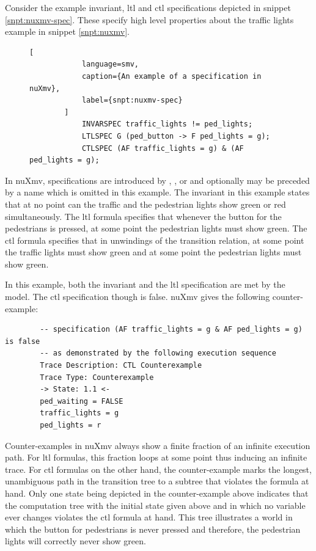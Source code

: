\begin{example}
    Consider the example invariant, \gls{ltl} and \gls{ctl} specifications depicted in snippet \ref{snpt:nuxmv-spec}.
    These specify high level properties about the traffic lights example in snippet \ref{snpt:nuxmv}.

    \begin{figure}
        \begin{lstlisting}[
            language=smv,
            caption={An example of a specification in nuXmv},
            label={snpt:nuxmv-spec}
        ]
            INVARSPEC traffic_lights != ped_lights;
            LTLSPEC G (ped_button -> F ped_lights = g);
            CTLSPEC (AF traffic_lights = g) & (AF ped_lights = g);
        \end{lstlisting}
    \end{figure}


    In nuXmv, specifications are introduced by , , or  and optionally may be preceded by a name which is omitted in this example.
    The invariant in this example states that at no point can the traffic and the pedestrian lights show green or red simultaneously.
    The \gls{ltl} formula specifies that whenever the button for the pedestrians is pressed, at some point the pedestrian lights must show green.
    The \gls{ctl} formula specifies that in unwindings of the transition relation, at some point the traffic lights must show green and at some point the pedestrian lights must show green.

    In this example, both the invariant and the \gls{ltl} specification are met by the model.
    The \gls{ctl} specification though is false.
    nuXmv gives the following counter-example:

    \begin{lstlisting}
        -- specification (AF traffic_lights = g & AF ped_lights = g)  is false
        -- as demonstrated by the following execution sequence
        Trace Description: CTL Counterexample
        Trace Type: Counterexample
        -> State: 1.1 <-
        ped_waiting = FALSE
        traffic_lights = g
        ped_lights = r
    \end{lstlisting}

    Counter-examples in nuXmv always show a finite fraction of an infinite execution path.
    For \gls{ltl} formulas, this fraction loops at some point thus inducing an infinite trace.
    For \gls{ctl} formulas on the other hand, the counter-example marks the longest, unambiguous path in the transition tree to a subtree that violates the formula at hand.
    Only one state being depicted in the counter-example above indicates that the computation tree with the initial state given above and in which no variable ever changes violates the \gls{ctl} formula at hand.
    This tree illustrates a world in which the button for pedestrians is never pressed and therefore, the pedestrian lights will correctly never show green.


\end{example}
